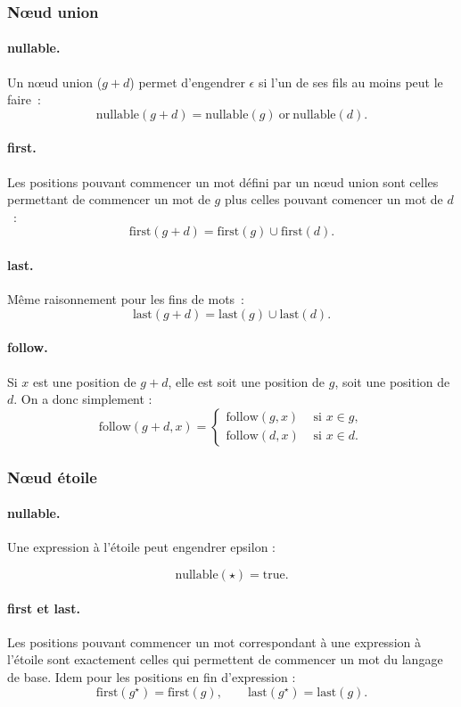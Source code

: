 \subsubsection{N\oe{}ud union}
\paragraph{nullable.}
Un n\oe{}ud union ($g+d$) permet d'engendrer $\epsilon$ si l'un de ses fils au moins peut le faire~: 
$$\mbox{nullable}(g + d)=\mbox{nullable}(g)\ \mbox{or}\ \mbox{nullable}(d).$$
\paragraph{first.}
Les positions pouvant commencer un mot d{\'e}fini par un n\oe{}ud union sont celles permettant de commencer un mot de $g$ plus celles pouvant comencer un mot de $d$~: 
$$\mbox{first}(g + d)=\mbox{first}(g) \cup \mbox{first}(d).$$ 
\paragraph{last.}
M{\^e}me raisonnement pour les fins de mots~: 
$$\mbox{last}(g + d)=\mbox{last}(g) \cup \mbox{last}(d).$$ 
\paragraph{follow.}
Si $x$ est une position de $g + d$, elle est soit une position de $g$, soit une position de $d$. On a donc simplement : 
$$\mbox{follow}(g +d,x)=\left\{
\begin{array}{ll}
\mbox{follow}(g,x)&  \mbox{ si }x \in g,\\
\mbox{follow}(d,x)& \mbox{ si } x \in d.
\end{array}
\right.$$
\subsubsection{N\oe{}ud {\'e}toile}
\paragraph{nullable.}
Une expression {\`a} l'{\'e}toile peut engendrer epsilon : 

$$\mbox{nullable}(\star)=\mbox{true}.$$
\paragraph{first et last. }
Les positions pouvant commencer un mot correspondant {\`a} une expression {\`a} l'{\'e}toile sont exactement celles qui permettent de commencer un mot du langage de base. Idem pour les positions en fin d'expression : 
$$\mbox{first}(g^\star)=\mbox{first}(g),\quad\quad \mbox{last}(g^\star)=\mbox{last}(g).$$
